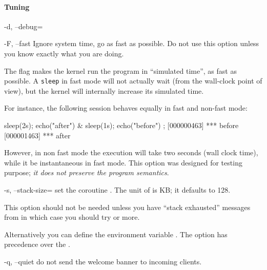 \paragraph{Tuning}
\begin{options}
\item[-d, --debug=\var{level}] \optionDebug
\item[-F, --fast]
  Ignore system time, go as fast as possible.  Do not use this option
  unless you know exactly what you are doing.

  The  flag makes the kernel run the program in
  ``simulated time'', as fast as possible. A \lstinline|sleep| in fast
  mode will not actually wait (from the wall-clock point of view), but
  the kernel will internally increase its simulated time.

  For instance, the following session behaves equally in fast and
  non-fast mode:

\begin{urbiscript}[firstnumber=1]
{ sleep(2s); echo("after") } & { sleep(1s); echo("before") };
[000000463] *** before
[000001463] *** after
\end{urbiscript}

  \noindent
  However, in non fast mode the execution will take two seconds (wall
  clock time), while it be instantaneous in fast mode. This option was
  designed for testing purpose; \emph{it does not preserve the program
    semantics}.

\item[-s, --stack-size=\var{size}] set the coroutine .
  The unit of  is KB; it defaults to 128.

  This option should not be needed unless you have ``stack exhausted''
  messages from  in which case you should try
   or more.

  Alternatively you can define the environment variable
  .  The option  has
  precedence over the .

\item[-q, --quiet] do not send the welcome banner to incoming clients.
\end{options}

